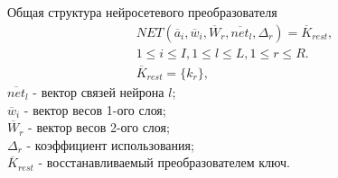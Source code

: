 \begin{frame}{Общая структура нейросетевого преобразователя}
    \begin{gather*}
        NET(\overline{a}_i, \overline{w}_i, \overline{W}_r, \overline{net}_l, \Delta_r) = \overline{K}_{rest},\\
        1 \leq i \leq I, 1 \leq l \leq L, 1 \leq r \leq R. \\
        \overline{K}_{rest}=\{ k_r \},    
    \end{gather*}
    $\overline{net}_l$ - вектор связей нейрона $l$; \\
    $\overline{w}_i$ - вектор весов 1-ого слоя; \\
    $\overline{W}_r$ - вектор весов 2-ого слоя; \\
    $\Delta_r$ - коэффициент использования; \\
    $\overline{K}_{rest}$ - восстанавливаемый преобразователем ключ.        
\end{frame}
